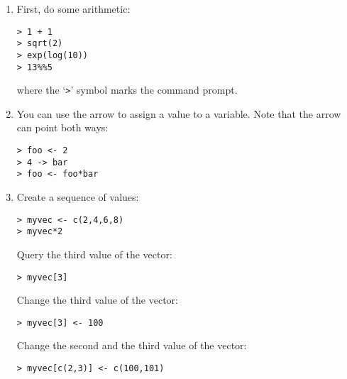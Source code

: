 \documentclass[11pt]{article}
\begin{document}
\begin{enumerate}
\item First, do some arithmetic:

\begin{verbatim}
> 1 + 1
> sqrt(2)
> exp(log(10))
> 13%%5
\end{verbatim}

\noindent where the `\verb|>|' symbol marks the command prompt.

\item You can use the arrow to assign a value to a variable. Note that the
arrow can point both ways:

\begin{verbatim}
> foo <- 2
> 4 -> bar
> foo <- foo*bar
\end{verbatim}

\item Create a sequence of values:

\begin{verbatim}
> myvec <- c(2,4,6,8)
> myvec*2
\end{verbatim}

Query the third value of the vector:

\begin{verbatim}
> myvec[3]
\end{verbatim}

Change the third value of the vector:

\begin{verbatim}
> myvec[3] <- 100
\end{verbatim}

Change the second and the third value of the vector:

\begin{verbatim}
> myvec[c(2,3)] <- c(100,101)
\end{verbatim}


\end{enumerate}
\end{document}
